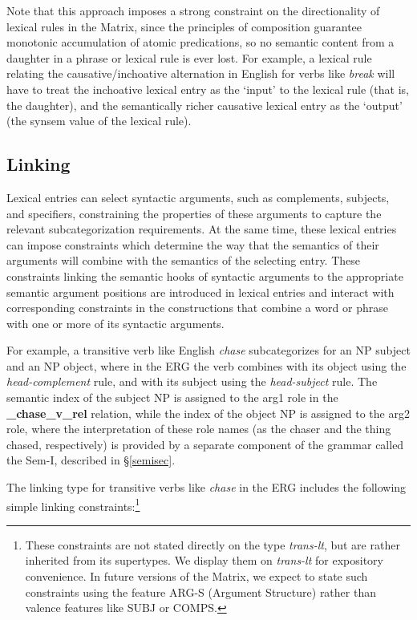 \documentclass[12pt]{article}
\newcommand{\fn}{\footnote}
\begin{document}
{Note that this approach imposes a strong constraint on the
directionality of lexical rules in the Matrix, since the principles of
composition guarantee monotonic accumulation of atomic predications,
so no semantic content from a daughter in a phrase or lexical rule is
ever lost.  For example, a lexical rule relating the
causative/inchoative alternation in English for verbs like {\it break}
will have to treat the inchoative lexical entry as the `input' to the
lexical rule (that is, the daughter), and the semantically richer
causative lexical entry as the `output' (the {\sc synsem} value of the
lexical rule).


\subsection{Linking}
\label{linksec}

Lexical entries can select syntactic arguments, such as complements, subjects,
and specifiers, constraining the properties of these arguments to capture the
relevant subcategorization requirements.  At the same time, these lexical
entries can impose constraints which determine the way that the semantics of 
their arguments will combine with the semantics of the selecting entry.
These constraints linking the semantic hooks of syntactic arguments to the
appropriate semantic argument positions are introduced in lexical entries
and interact with corresponding constraints in the constructions
that combine a word or phrase with one or more of its syntactic arguments.

For example, a transitive verb like English {\it chase} subcategorizes for an 
NP subject and an NP object, where in the ERG the verb combines with its 
object using the {\it head-complement} rule, and with its subject using the
{\it head-subject} rule.  The semantic index of the subject NP is assigned
to the {\sc arg1} role in the {\bf \_chase\_v\_rel} relation, while the index of
the object NP is assigned to the {\sc arg2} role, where the interpretation
of these role names (as the chaser and the thing chased, respectively) is
provided by a separate component of the grammar called the Sem-I, described
in \S\ref{semisec}.

The linking type for transitive verbs like {\it chase} in the ERG includes the 
following simple linking constraints:\fn{These \label{argsfn}constraints are 
not stated directly
on the type {\it trans-lt}, but are rather inherited from its supertypes.  We
display them on {\it trans-lt} for expository convenience.  In future versions 
of the Matrix,
we expect to state such constraints using the feature {\sc ARG-S} (Argument Structure) rather than valence features like SUBJ or COMPS.}

}
\end{document}
